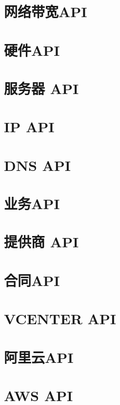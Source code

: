 \documentclass[letterpaper,10pt,english]{sphinxmanual}
\begin{document}
\chapter{网络带宽API}
\label{networkBandwidth:api}\label{networkBandwidth::doc}

\chapter{硬件API}
\label{hardware:api}\label{hardware::doc}

\chapter{服务器 API}
\label{server:api}\label{server::doc}

\chapter{IP API}
\label{ip:ip-api}\label{ip::doc}

\chapter{DNS API}
\label{dns:dns-api}\label{dns::doc}

\chapter{业务API}
\label{app:api}\label{app::doc}

\chapter{提供商 API}
\label{supplier:api}\label{supplier::doc}

\chapter{合同API}
\label{agreement:api}\label{agreement::doc}

\chapter{VCENTER API}
\label{vcenter::doc}\label{vcenter:vcenter-api}

\chapter{阿里云API}
\label{aliyun:api}\label{aliyun::doc}

\chapter{AWS API}
\label{aws::doc}\label{aws:aws-api}


\renewcommand{\indexname}{索引}
\printindex
\end{document}
